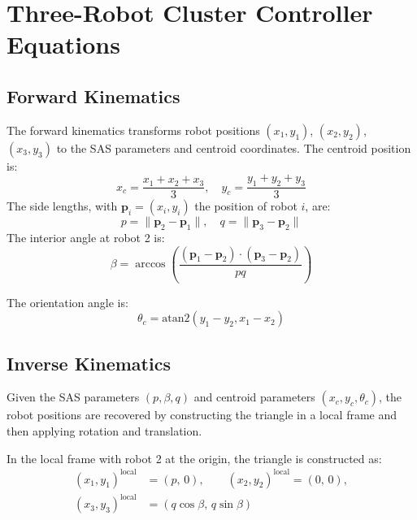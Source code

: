 \documentclass[lettersize,journal]{IEEEtran}
\begin{document}
\section{Three-Robot Cluster Controller Equations}

\subsection{Forward Kinematics}

The forward kinematics transforms robot positions $(x_1, y_1)$, $(x_2, y_2)$, $(x_3, y_3)$ to the SAS parameters and centroid coordinates. The centroid position is:
\begin{equation}\label{eq:20}
x_c = \frac{x_1 + x_2 + x_3}{3}, \quad y_c = \frac{y_1 + y_2 + y_3}{3}
\end{equation}
The side lengths, with $\mathbf{p}_i = (x_i, y_i)$ the position of robot $i$, are:
\begin{equation}\label{eq:21}
p = \lVert \mathbf{p}_2 - \mathbf{p}_1 \rVert, \quad q = \lVert \mathbf{p}_3 - \mathbf{p}_2 \rVert
\end{equation}
The interior angle at robot 2 is:
\begin{equation}\label{eq:23}
\beta = \arccos\left(\frac{(\mathbf{p}_1 - \mathbf{p}_2) \cdot (\mathbf{p}_3 - \mathbf{p}_2)}{pq}\right)
\end{equation}

The orientation angle is:
\begin{equation}\label{eq:24}
\theta_c = \text{atan2}(y_1 - y_2, x_1 - x_2)
\end{equation}

\subsection{Inverse Kinematics}

Given the SAS parameters $(p, \beta, q)$ and centroid parameters $(x_c, y_c, \theta_c)$, the robot positions are recovered by constructing the triangle in a local frame and then applying rotation and translation.

In the local frame with robot 2 at the origin, the triangle is constructed as:
\begin{equation}\label{eq:25}
\begin{aligned}
(x_1, y_1)^{\text{local}} &= (p,\, 0), \qquad (x_2, y_2)^{\text{local}} = (0,\, 0), \\
(x_3, y_3)^{\text{local}} &= (q\cos\beta,\, q\sin\beta)
\end{aligned}
\end{equation}
\end{document}
